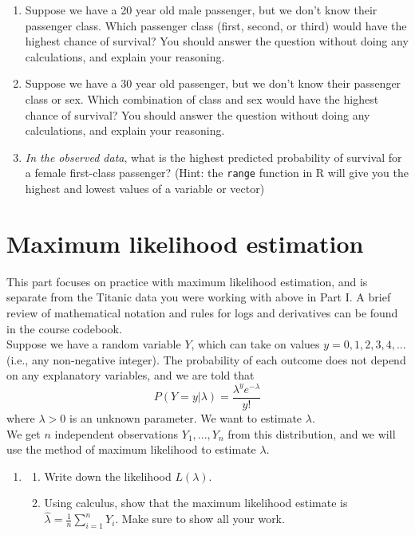 \documentclass[11pt]{article}
\begin{document}
\begin{enumerate}
\begin{enumerate}
\item Suppose we have a 20 year old male passenger, but we don't know their passenger class. Which passenger class (first, second, or third) would have the highest chance of survival? You should answer the question without doing any calculations, and explain your reasoning.

\item Suppose we have a 30 year old passenger, but we don't know their passenger class or sex. Which combination of class and sex would have the highest chance of survival? You should answer the question without doing any calculations, and explain your reasoning.

\item \textit{In the observed data}, what is the highest predicted probability of survival for a female first-class passenger? (Hint: the \verb;range; function in R will give you the highest and lowest values of a variable or vector)

\end{enumerate}

\end{enumerate}

\newpage

\section{Maximum likelihood estimation}

This part focuses on practice with maximum likelihood estimation, and is separate from the Titanic data you were working with above in Part I. A brief review of mathematical notation and rules for logs and derivatives can be found in the course codebook.\\

\noindent Suppose we have a random variable $Y$, which can take on values $y = 0, 1, 2, 3, 4,...$ (i.e., any non-negative integer). The probability of each outcome does not depend on any explanatory variables, and we are told that
$$P(Y = y | \lambda) = \dfrac{\lambda^y e^{-\lambda}}{y!}$$
where $\lambda > 0$ is an unknown parameter. We want to estimate $\lambda$.\\

\noindent We get $n$ independent observations $Y_1,...,Y_n$ from this distribution, and we will use the method of maximum likelihood to estimate $\lambda$.

\begin{enumerate}
\item[4.] 

\begin{enumerate}
\item Write down the likelihood $L(\lambda)$.

\item Using calculus, show that the maximum likelihood estimate is $\widehat{\lambda} = \frac{1}{n} \sum \limits_{i=1}^n Y_i$. Make sure to show all your work.
\end{enumerate}
\end{enumerate}
\end{document}
